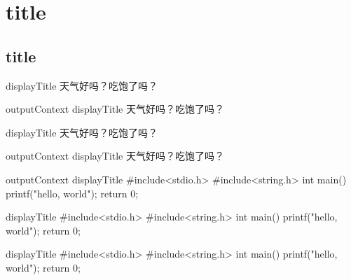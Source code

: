 \section{title} \label{sec:title}

\subsection{title} \label{sbsec:title}

\begin{Win}{displayTitle}
  天气好吗？吃饱了吗？
\end{Win}

\begin{WinOutput}{
  outputContext
}{displayTitle}
  天气好吗？吃饱了吗？
\end{WinOutput}

\begin{Mac}{displayTitle}
  天气好吗？吃饱了吗？
\end{Mac}

\begin{MacOutput}{
  outputContext
}{displayTitle}
  天气好吗？吃饱了吗？
\end{MacOutput}

\begin{GitOutput}[bash]{
    outputContext
  }{displayTitle}
  #include<stdio.h>
  #include<string.h>
  int main() {
    printf("hello, world");
    return 0;
  }
\end{GitOutput}

\begin{Git}[c]{displayTitle}
  #include<stdio.h>
  #include<string.h>
  int main() {
    printf("hello, world");
    return 0;
  }
\end{Git}

\begin{Code}[c]{displayTitle}
#include<stdio.h>
#include<string.h>
int main() {
  printf("hello, world");
  return 0;
}
\end{Code}



